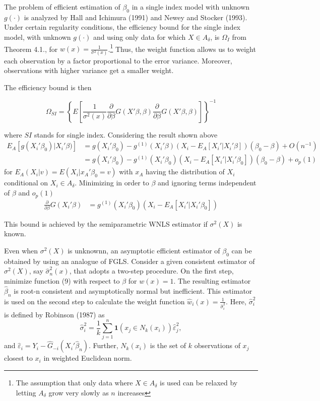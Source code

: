 \documentclass[a4paper]{article}
\begin{document}
The problem of efficient estimation of $\beta_0$ in a single index model with unknown $g(\cdot)$ is analyzed by Hall and Ichimura (1991) and Newey and Stocker (1993). Under certain regularity conditions, the efficiency bound for the single index model, with unknown $g(\cdot)$ and using only data for which $X \in A_{\delta}$, is $\Omega_I$ from Theorem 4.1., for $w(x) = \frac{1}{\sigma^2(x)}$.\footnote{The assumption that only data where  $X \in A_{\delta}$ is used can be relaxed by letting $A_\delta$ grow very slowly as $n$ increases} Thus, the weight function allows us to weight each observation by a factor proportional to the error variance. Moreover, observations with higher variance get a smaller weight. 

The efficiency bound is then

\begin{equation}
\Omega_{SI} = \left\{ E\left[\frac{1}{\sigma^2(x)}\frac{\partial}{\partial \beta}
 G(X'\beta,\beta)\frac{\partial}{\partial \beta} G(X'\beta,\beta) \right] \right\}^{-1}
\end{equation}

where $SI$ stands for single index. Considering the result shown above
\begin{align*}
E_A[g(X_i'\beta_0)|X_i'\beta)] & = g(X_i'\beta_0) - g^{(1)}(X_i'\beta)( X_i - E_A[X_i'|X_i'\beta])(\beta_0 - \beta) + O(n^{-1})\\
							  & = g(X_i'\beta_0) - g^{(1)}(X_i'\beta_0)( X_i - E_A[X_i'|X_i'\beta_0])(\beta_0 - \beta) + o_p(1)											   
\end{align*}
for $E_A(X_i|v) = E(X_i|x_A'\beta_0 = v)$ with $x_A$ having the distribution of $X_i$ conditional on $X_i \in A_\delta$. Minimizing in order to $\beta$ and ignoring terms independent of $\beta$ and $o_p(1)$ 
\begin{align*}
 \frac{\partial}{\partial \beta} G(X_i'\beta) & = g^{(1)}(X_i'\beta_0)( X_i - E_A[X_i'|X_i'\beta_0])
\end{align*}

This bound is achieved by the semiparametric WNLS estimator if $\sigma^2(X)$ is known.

Even when $\sigma^2(X)$ is unknownn, an asymptotic efficient estimator of $\beta_0$ can be obtained by using an analogue of FGLS.  Consider a given consistent estimator of $\sigma^2(X)$, say $\hat{\sigma}_{n}^{2}(x)$, that adopts a two-step procedure. On the first step, minimize function (9) with respect to $\beta$ for $w(x) = 1$. The resulting estimator $\hat{\beta}_n$ is root-n consistent and asymptotically normal but inefficient. This estimator is used on the second step to calculate the weight function $\hat{w}_i(x) = \frac{1}{\hat{\sigma}_{i}^{2}}$. Here, $\hat{\sigma}_{i}^{2}$ is defined by Robinson (1987) as 
\[\hat{\sigma}_{i}^{2} = \frac{1}{k}\sum_{j=1}^{n} \mathbf{1}{(x_j \in N_k(x_i))}\hat{\varepsilon}_{j}^{2} ,\]
and $\hat{\varepsilon}_i = Y_i - \hat{G}_{-i}(X_i'\hat{\beta}_n)$. Further, $N_k(x_i)$ is the set of $k$ observations of $x_j$ closest to $x_i$ in weighted Euclidean norm.
\end{document}

